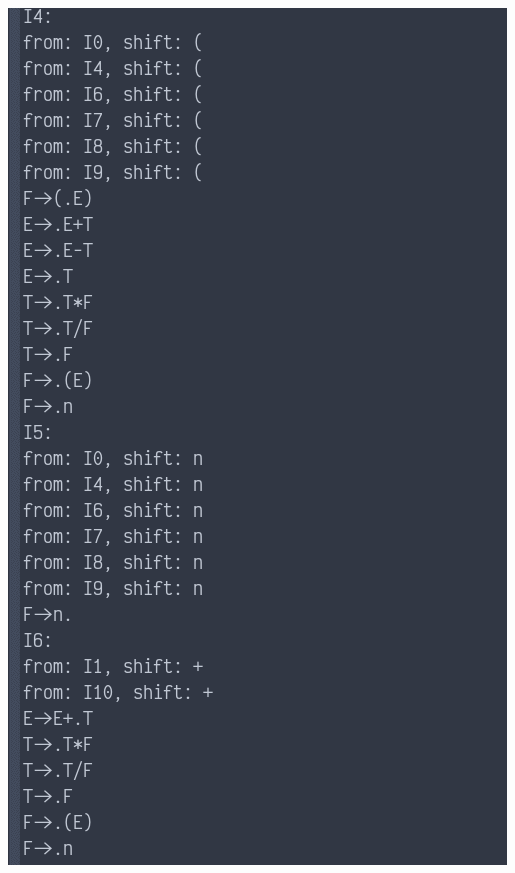 \documentclass[fontset=none,UTF8,a4paper,zihao=-4]{ctexart}
\begin{document}
\begin{itemize}
\begin{center}
\includegraphics[width=.9\linewidth]{运行截图/2020-11-26_00-45-36_screenshot.png}
\end{center}


\end{itemize}
\end{document}
